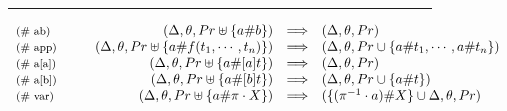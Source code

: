 \documentclass[11pt,a4paper]{amsart}
\theoremstyle{plain}
\theoremstyle{definition}
\theoremstyle{remark}
\begin{document}



\begin{figure}[!t]
\centering
\rule{15.3cm}{0.01cm}
    $$    
    \begin{array}{l@{\hspace{1cm}}rll}
        {\text{\footnotesize ($\#$ ab)}} & (\Delta, \theta, Pr \uplus \{a \# b \}) & \Longrightarrow & (\Delta, \theta, Pr) \\
        {\text{\footnotesize ($\#$ app)}} & (\Delta, \theta, Pr \uplus  \{a \# f(t_1,\cdots, t_n)\}) & \Longrightarrow & (\Delta, \theta, Pr \cup \{a \# t_1,\cdots, a \# t_n \}) \; \\
        {\text{\footnotesize ($\#$ a[a])}} & (\Delta, \theta, Pr \uplus \{a \# [a] t \}) & \Longrightarrow & (\Delta, \theta, Pr) \\
        {\text{\footnotesize ($\#$ a[b])}} & (\Delta, \theta, Pr \uplus \{a \# [b] t \}) & \Longrightarrow & (\Delta, \theta, Pr \cup \{a \#t\}) \\
        {\text{\footnotesize ($\#$ var)}} & (\Delta, \theta, Pr \uplus \{a \# \pi \cdot X\}) & \Longrightarrow & (\{(\pi^{-1} \cdot a)\# X\}\cup \Delta, \theta, Pr) \\
    \end{array}
    $$   



\end{figure}
\end{document}
